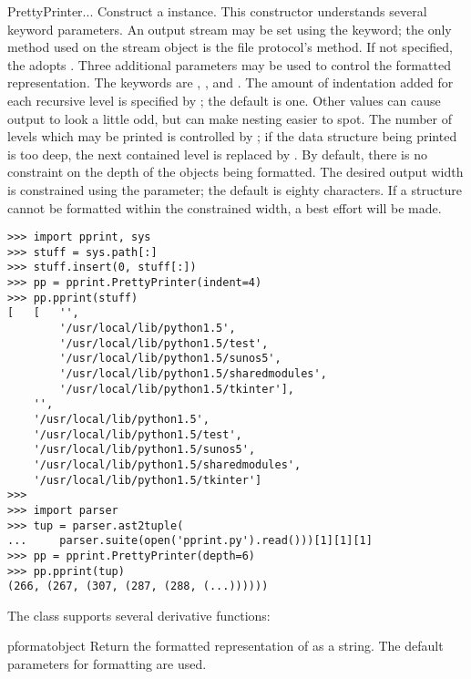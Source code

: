 \begin{classdesc}{PrettyPrinter}{...}
Construct a  instance.  This constructor
understands several keyword parameters.  An output stream may be set
using the  keyword; the only method used on the stream
object is the file protocol's  method.  If not
specified, the  adopts .  Three
additional parameters may be used to control the formatted
representation.  The keywords are , , and
.  The amount of indentation added for each recursive level
is specified by ; the default is one.  Other values can
cause output to look a little odd, but can make nesting easier to
spot.  The number of levels which may be printed is controlled by
; if the data structure being printed is too deep, the next
contained level is replaced by .  By default, there is no
constraint on the depth of the objects being formatted.  The desired
output width is constrained using the  parameter; the
default is eighty characters.  If a structure cannot be formatted
within the constrained width, a best effort will be made.

\begin{verbatim}
>>> import pprint, sys
>>> stuff = sys.path[:]
>>> stuff.insert(0, stuff[:])
>>> pp = pprint.PrettyPrinter(indent=4)
>>> pp.pprint(stuff)
[   [   '',
        '/usr/local/lib/python1.5',
        '/usr/local/lib/python1.5/test',
        '/usr/local/lib/python1.5/sunos5',
        '/usr/local/lib/python1.5/sharedmodules',
        '/usr/local/lib/python1.5/tkinter'],
    '',
    '/usr/local/lib/python1.5',
    '/usr/local/lib/python1.5/test',
    '/usr/local/lib/python1.5/sunos5',
    '/usr/local/lib/python1.5/sharedmodules',
    '/usr/local/lib/python1.5/tkinter']
>>>
>>> import parser
>>> tup = parser.ast2tuple(
...     parser.suite(open('pprint.py').read()))[1][1][1]
>>> pp = pprint.PrettyPrinter(depth=6)
>>> pp.pprint(tup)
(266, (267, (307, (287, (288, (...))))))
\end{verbatim}
\end{classdesc}



The  class supports several derivative functions:

\begin{funcdesc}{pformat}{object}
Return the formatted representation of  as a string.  The
default parameters for formatting are used.
\end{funcdesc}

